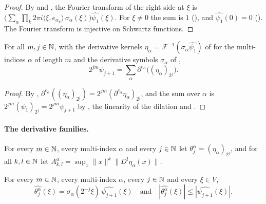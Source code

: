 \begin{proof}
\leanok
By  and , the Fourier transform
of the right side at $\xi$ is
$\bigl( \sum_\alpha \prod_k 2\pi i \langle \xi, e_{\alpha_k} \rangle \, \sigma_\alpha(\xi) \bigr)
\widehat{\psi_1}(\xi)$. For $\xi \neq 0$ the sum is $1$ (), and
$\widehat{\psi_1}(0) = 0$ (). The Fourier transform is injective on
Schwartz functions.
\end{proof}

\begin{corollary}
\label{cor:psi-derivatives-dilated}
\leanok
{}
For all $m, j \in \mathbb{N}$, with the derivative kernels
$\eta_\alpha = \mathcal F^{-1}(\sigma_\alpha \widehat{\psi_1})$ of 
for the multi-indices $\alpha$ of length $m$ and the derivative symbols $\sigma_\alpha$ of
,
\[
  2^{jm} \psi_{j+1} = \sum_\alpha \partial^{e_\alpha} \bigl( (\eta_\alpha)_{2^j} \bigr) .
\]
\end{corollary}

\begin{proof}
\leanok
By ,
$\partial^{e_\alpha} ((\eta_\alpha)_{2^j}) = 2^{jm} (\partial^{e_\alpha} \eta_\alpha)_{2^j}$, and
the sum over $\alpha$ is $2^{jm} (\psi_1)_{2^j} = 2^{jm} \psi_{j+1}$ by
, the linearity of the dilation and .
\end{proof}

\paragraph{The derivative families.}

\begin{definition}
\label{def:derivative-family}
\leanok
{}
For every $m \in \mathbb{N}$, every multi-index $\alpha$ and every $j \in \mathbb{N}$ let
$\theta^\alpha_j = (\eta_\alpha)_{2^j}$, and for all $k, l \in \mathbb{N}$ let
$A^\alpha_{k,l} = \sup_x \|x\|^k \|D^l \eta_\alpha(x)\|$.
\end{definition}

\begin{lemma}
\label{lem:derivative-family-frequency}
\leanok
{}
For every $m \in \mathbb{N}$, every multi-index $\alpha$, every $j \in \mathbb{N}$ and every $\xi \in V$,
\[
  \widehat{\theta^\alpha_j}(\xi) = \sigma_\alpha(2^{-j} \xi) \, \widehat{\psi_{j+1}}(\xi)
  \quad \text{and} \quad
  |\widehat{\theta^\alpha_j}(\xi)| \leq |\widehat{\psi_{j+1}}(\xi)| .
\]
\end{lemma}

